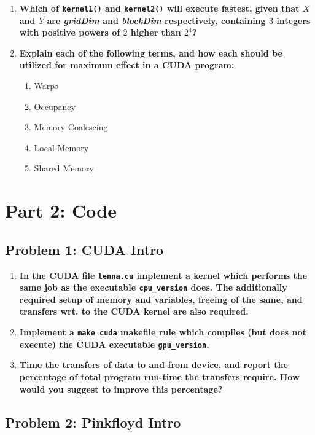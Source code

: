 \begin{enumerate}

\item \textbf{Which of \texttt{kernel1()} and \texttt{kernel2()} will execute fastest, given that $X$ and $Y$ are \textit{gridDim} and \textit{blockDim} respectively, containing $3$ integers with positive powers of $2$ higher than $2^4$?}

\item \textbf{Explain each of the following terms, and how each should be utilized for maximum effect in a CUDA program:}

\begin{enumerate}
\item Warps
\item Occupancy
\item Memory Coalescing
\item Local Memory
\item Shared Memory
\end{enumerate}

\end{enumerate}

\section*{Part 2: Code}

\subsection*{Problem 1: CUDA Intro}

\begin{enumerate}

\item \textbf{In the CUDA file \texttt{lenna.cu} implement a kernel which performs the same job as the executable \texttt{cpu\_version} does. The additionally required setup of memory and variables, freeing of the same, and transfers wrt. to the CUDA kernel are also required.}

\item \textbf{Implement a \texttt{make cuda} makefile rule which compiles (but does not execute) the CUDA executable \texttt{gpu\_version}.}

\item \textbf{Time the transfers of data to and from device, and report the percentage of total program run-time the transfers require. How would you suggest to improve this percentage?}

\end{enumerate}

\subsection*{Problem 2: Pinkfloyd Intro}



